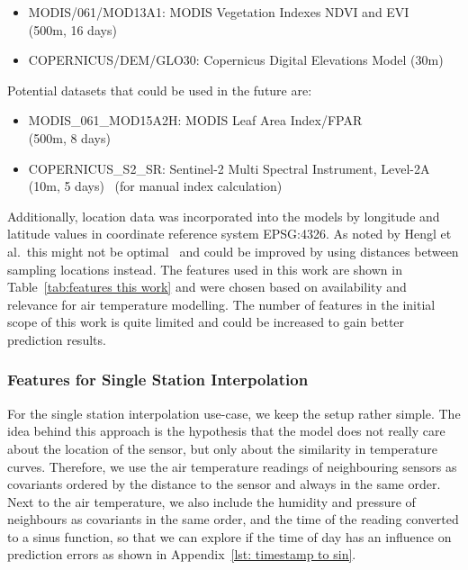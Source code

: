 \begin{itemize}
    \item MODIS/061/MOD13A1: MODIS Vegetation Indexes NDVI and EVI\\
    (500m, 16 days)~\cite{didan2021modis}
    \item COPERNICUS/DEM/GLO30: Copernicus Digital Elevations Model (30m)~\cite{copernicus30dem}
\end{itemize}

Potential datasets that could be used in the future are:

\begin{itemize}
    \item MODIS\_061\_MOD15A2H: MODIS Leaf Area Index/FPAR \\
    (500m, 8 days)~\cite{myneni2021modis}
    \item COPERNICUS\_S2\_SR: Sentinel-2 Multi Spectral Instrument, Level-2A\\
    (10m, 5 days)~\cite{sentinel2msi} (for manual index calculation)
\end{itemize}

Additionally, location data was incorporated into the models by longitude and latitude values in coordinate reference system EPSG:4326. As noted by Hengl et al.\ this might not be optimal~\cite{hengl2018random} and could be improved by using distances between sampling locations instead. The features used in this work are shown in Table~\ref{tab:features this work} and were chosen based on availability and relevance for air temperature modelling. The number of features in the initial scope of this work is quite limited and could be increased to gain better prediction results.

\subsubsection{Features for Single Station Interpolation}

For the single station interpolation use-case, we keep the setup rather simple. The idea behind this approach is the hypothesis that the model does not really care about the location of the sensor, but only about the similarity in temperature curves. Therefore, we use the air temperature readings of neighbouring sensors as covariants ordered by the distance to the sensor and always in the same order. Next to the air temperature, we also include the humidity and pressure of neighbours as covariants in the same order, and the time of the reading converted to a sinus function, so that we can explore if the time of day has an influence on prediction errors as shown in Appendix~\ref{lst: timestamp to sin}.

